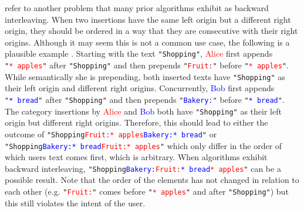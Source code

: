  refer to another problem that many prior algorithms exhibit as backward interleaving. When two insertions have the same left origin but a different right origin, they should be ordered in a way that they are consecutive with their right origins. Although it may seem this is not a common use case, the following is a plausible example \cite[Figure 2]{2023-weidner-minimizing-interleaving}. Starting with the text \texttt{"Shopping"}, \textcolor{red}{Alice} first appends \texttt{"\textcolor{red}{*~apples}"} after \texttt{"Shopping"} and then prepends \texttt{"\textcolor{red}{Fruit:}"} before \texttt{"\textcolor{red}{*~apples}"}. While semantically she is prepending, both inserted texts have \texttt{"Shopping"} as their left origin and different right origins. Concurrently, \textcolor{blue}{Bob} first appends \texttt{"\textcolor{blue}{*~bread}"} after \texttt{"Shopping"} and then prepends \texttt{"\textcolor{blue}{Bakery:}"} before \texttt{"\textcolor{blue}{*~bread}"}. The category insertions by \textcolor{red}{Alice} and \textcolor{blue}{Bob} both have \texttt{"Shopping"} as their left origin but different right origins. Therefore, this should lead to either the outcome of \texttt{"Shopping\textcolor{red}{Fruit:*~apples}\textcolor{blue}{Bakery:*~bread}"} or \texttt{"Shopping\textcolor{blue}{Bakery:*~bread}\textcolor{red}{Fruit:*~apples}"} which only differ in the order of which users text comes first, which is arbitrary. When algorithms exhibit backward interleaving, \texttt{"Shopping\textcolor{blue}{Bakery:}\textcolor{red}{Fruit:}\textcolor{blue}{*~bread}\textcolor{red}{*~apples}"} can be a possible result.
Note that the order of the elements has not changed in relation to each other (e.g. \texttt{"\textcolor{red}{Fruit:}"} comes before \texttt{"\textcolor{red}{*~apples}"} and after \texttt{"Shopping"}) but this still violates the intent of the user.

